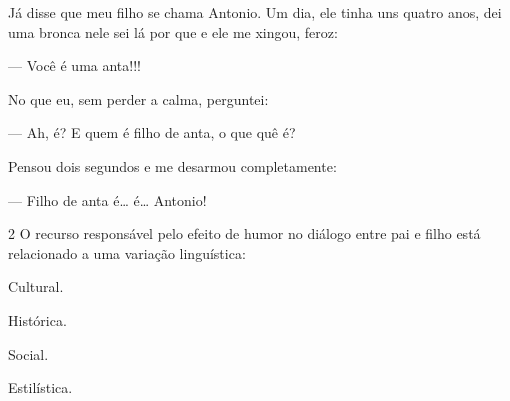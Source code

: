 \begin{myquote}
\hspace\parindent Já disse que meu filho se chama Antonio. Um dia, ele tinha uns quatro
anos, dei uma bronca nele sei lá por que e ele me xingou, feroz:

— Você é uma anta!!!

No que eu, sem perder a calma, perguntei:

— Ah, é? E quem é filho de anta, o que quê é?

Pensou dois segundos e me desarmou completamente:

— Filho de anta é\ldots{} é\ldots{} Antonio!

\end{myquote}

\num{2} O recurso responsável pelo efeito de humor no diálogo entre pai e filho
está relacionado a uma variação linguística:

\begin{escolha}
\item Cultural.
\item Histórica.
\item Social.
\item Estilística.
\end{escolha}



